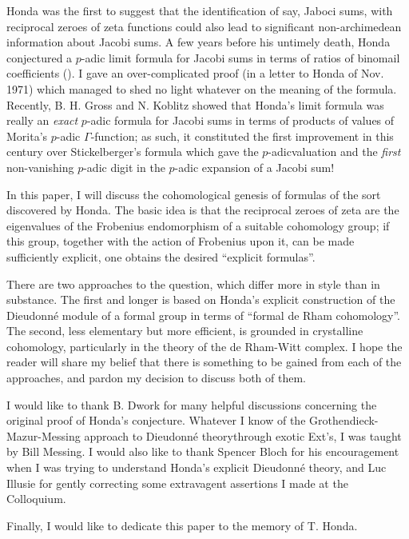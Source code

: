 Honda was the first to suggest that the identification of say, Jaboci sums, with reciprocal zeroes of zeta functions could also lead to significant non-archimedean information about Jacobi sums. A few years before his untimely death, Honda conjectured a $p$-adic limit formula for Jacobi sums in terms of ratios of binomail coefficients (\cite{art6-key23}). I gave an over-complicated proof (in a letter to Honda of Nov. 1971) which managed to shed no light whatever on the meaning of the formula. Recently, B. H. Gross and N. Koblitz \cite{art6-key14} showed that Honda's limit formula was really an {\em exact} $p$-adic formula for Jacobi sums in terms of products of values of Morita's $p$-adic $\Gamma$-function; as such, it constituted the first improvement in this century over Stickelberger's formula which gave the $p$-adic\pageoriginale valuation and the {\em first} non-vanishing $p$-adic digit in the $p$-adic expansion of a Jacobi sum!

In this paper, I will discuss the cohomological genesis of formulas of the sort discovered by Honda. The basic idea is that the reciprocal zeroes of zeta are the eigenvalues of the Frobenius endomorphism of a suitable cohomology group; if this group, together with the action of Frobenius upon it, can be made sufficiently explicit, one obtains the desired ``explicit formulas''.

There are two approaches to the question, which differ more in style than in substance. The first and longer is based on Honda's explicit construction of the Dieudonn\'e module of a formal group in terms of ``formal de Rham cohomology''. The second, less elementary but more efficient, is grounded in crystalline cohomology, particularly in the theory of the de Rham-Witt complex. I hope the reader will share my belief that there is something to be gained from each of the approaches, and pardon my decision to discuss both of them.

I would like to thank B. Dwork for many helpful discussions concerning the original proof of Honda's conjecture. Whatever I know of the Grothendieck-Mazur-Messing approach to Dieudonn\'e theory\break through exotic Ext's, I was taught by Bill Messing. I would also like to thank Spencer Bloch for his encouragement when I was trying to understand Honda's explicit Dieudonn\'e theory, and Luc Illusie for gently correcting some extravagent assertions I made at the Colloquium.

Finally, I would like to dedicate this paper to the memory of T. Honda.

